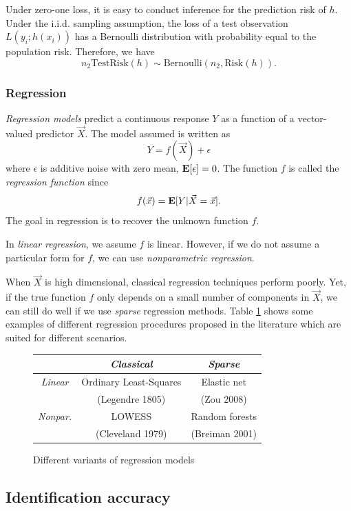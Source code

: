 
Under zero-one loss, it is easy to conduct inference for the
prediction risk of $h$.  Under the i.i.d. sampling assumption, the
loss of a test observation $L(y_i; h(x_i))$ has a Bernoulli
distribution with probability equal to the population risk.  Therefore,
we have
\[
n_2 \text{TestRisk}(h) \sim \text{Bernoulli}(n_2, \text{Risk}(h)).
\]


\subsubsection{Regression}

\emph{Regression models} predict a continuous response $Y$ as a function of a vector-valued predictor $\vec{X}$.
The model assumed is written as
\[
Y = f(\vec{X}) + \epsilon
\]
where $\epsilon$ is additive noise with zero mean, $\textbf{E}[\epsilon] = 0$.
The function $f$ is called the \emph{regression function} since
\[
f(\vec{x}) = \textbf{E}[Y|\vec{X} = \vec{x}].
\]
The goal in regression is to recover the unknown function $f$.

In \emph{linear regression}, we assume $f$ is linear. However, if we
do not assume a particular form for $f$, we can use
\emph{nonparametric regression}.

When $\vec{X}$ is high dimensional, classical regression techniques
perform poorly.  Yet, if the true function $f$ only depends on a small
number of components in $\vec{X}$, we can still do well if we use
\emph{sparse} regression methods. Table \ref{tab:regression} shows
some examples of different regression procedures proposed in the
literature which are suited for different scenarios.

\begin{figure}
\centering
\begin{tabular}{c|c|c|}
 & \emph{Classical} & \emph{Sparse} \\ \hline
 \emph{Linear} & Ordinary Least-Squares  & Elastic net \\ 
  & (Legendre 1805) & (Zou 2008)  \\\hline
 \emph{Nonpar.} & LOWESS  & Random forests  \\ 
   & (Cleveland 1979) & (Breiman 2001)  \\\hline
\end{tabular}
\caption{Different variants of regression models}
\label{tab:regression}
\end{figure}

\subsection{Identification accuracy}\label{sec:ident_risk}

